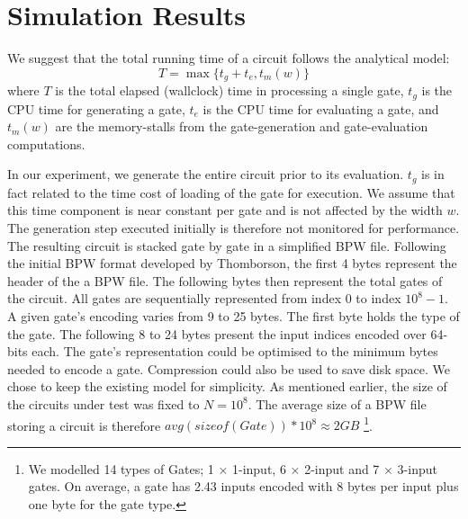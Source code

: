 \section{Simulation Results}
We suggest that the total running time of a circuit follows the analytical model:
\begin{equation}
T = \max\{ t_g + t_e, t_m(w) \}
\end{equation}
where $T$ is the total elapsed (wallclock) time in processing a single gate, $t_g$
is the CPU time for generating a gate, $t_e$ is the CPU time for evaluating a gate,
and $t_m(w)$ are the memory-stalls from the gate-generation and gate-evaluation
computations.
\par
In our experiment, we generate the entire circuit prior to its evaluation. $t_g$
is in fact related to the time cost of loading of the gate for execution. We assume
that this time component is near constant per gate and is not affected by the
width $w$. The generation step executed initially is therefore not monitored for
performance. The resulting circuit is stacked gate by gate in a simplified BPW file.
Following the initial BPW format developed by Thomborson, the first 4 bytes represent
the header of the a BPW file\cite{clark}. The following bytes then represent the
total gates of the circuit. All gates are sequentially represented from index $0$
to index $10^8-1$. A given gate's encoding varies from 9 to 25 bytes. The first
byte holds the type of the gate. The following 8 to 24 bytes present the input
indices encoded over 64-bits each. The gate's representation could be optimised
to the minimum bytes needed to encode a gate. Compression could also be used to
save disk space. We chose to keep the existing model for simplicity. As mentioned
earlier, the size of the circuits under test was fixed to $N = 10^8$. The average
size of a BPW file storing a circuit is therefore $avg(sizeof(Gate)) * 10^8 \approx 2 GB$
\footnote{We modelled 14 types of Gates; 1 $\times$ 1-input, 6 $\times$ 2-input and 7 $\times$ 3-input gates. On average, a gate has 2.43 inputs encoded with 8 bytes per input plus one byte for the gate type.}.

